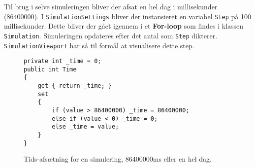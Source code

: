 Til brug i selve simuleringen bliver der afsat en hel dag i millisekunder (86400000). I \texttt{SimulationSettings} bliver der instansieret en variabel \texttt{Step} på 100 millisekunder. Dette bliver der gået igennem i et \textbf{For-loop} som findes i klassen \texttt{Simulation}. Simuleringen opdateres efter det antal som \texttt{Step} dikterer. \texttt{SimulationViewport} har så til formål at visualisere dette step.

\begin{figure}[H]
\begin{lstlisting}
private int _time = 0;
public int Time
{
    get { return _time; }
    set
    {
        if (value > 86400000) _time = 86400000;
        else if (value < 0) _time = 0;
        else _time = value;
    }
}
\end{lstlisting}
\caption{Tids-afsætning for en simulering, 86400000ms eller en hel dag.}
\label{TimeForSim}
\end{figure}


